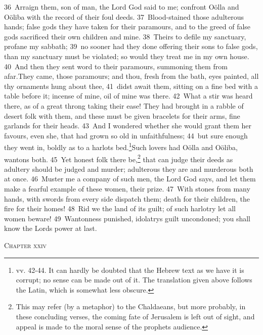 \documentclass[10pt]{book} %
\begin{document}
\textcolor{benred8}{36}~Arraign them, son of man, the Lord God said to me; confront O\"{o}lla and O\"{o}liba with the record of their foul deeds. \textcolor{benred8}{37}~Blood-stained those adulterous hands; false gods they have taken for their paramours, and to the greed of false gods sacrificed their own children and mine. \textcolor{benred8}{38}~Theirs to defile my sanctuary, profane my sabbath; \textcolor{benred8}{39}~no sooner had they done offering their sons to false gods, than my sanctuary must be violated; so would they treat me in my own house. \textcolor{benred8}{40}~And then they sent word to their paramours, summoning them from afar.They came, those paramours; and thou, fresh from the bath, eyes painted, all thy ornaments hung about thee, \textcolor{benred8}{41}~didst await them, sitting on a fine bed with a table before it; incense of mine, oil of mine was there. \textcolor{benred8}{42}~What a stir was heard there, as of a great throng taking their ease! They had brought in a rabble of desert folk with them, and these must be given bracelets for their arms, fine garlands for their heads. \textcolor{benred8}{43}~And I wondered whether she would grant them her favours, even she, that had grown so old in unfaithfulness; \textcolor{benred8}{44}~but sure enough they went in, boldly as to a harlot\textquotesingle s bed.\footnote[2]{vv. 42-44. It can hardly be doubted that the Hebrew text as we have it is corrupt; no sense can be made out of it. The translation given above follows the Latin, which is somewhat less obscure.}Such lovers had O\"{o}lla and O\"{o}liba, wantons both. \textcolor{benred8}{45}~Yet honest folk there be,\footnote[3]{This may refer (by a metaphor) to the Chaldaeans, but more probably, in these concluding verses, the coming fate of Jerusalem is left out of sight, and appeal is made to the moral sense of the prophet\textquotesingle s audience.} that can judge their deeds as adultery should be judged and murder; adulterous they are and murderous both at once. \textcolor{benred8}{46}~Muster me a company of such men, the Lord God says, and let them make a fearful example of these women, their prize. \textcolor{benred8}{47}~With stones from many hands, with swords from every side dispatch them; death for their children, the fire for their homes! \textcolor{benred8}{48}~Rid we the land of its guilt; of such harlotry let all women beware! \textcolor{benred8}{49}~Wantonness punished, idolatry\textquotesingle s guilt uncondoned; you shall know the Lord\textquotesingle s power at last.
\begin{large}\begin{center}\textsc{Chapter xxiv}\end{center}\end{large}
\end{document}
